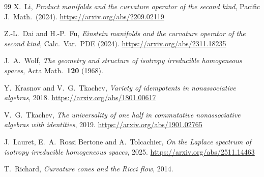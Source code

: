\begin{thebibliography}{99}
 X.~Li,
\emph{Product manifolds and the curvature operator of the second kind},
Pacific J.\ Math.\ (2024).
\url{https://arxiv.org/abs/2209.02119}

 Z.-L.~Dai and H.-P.~Fu,
\emph{Einstein manifolds and the curvature operator of the second kind},
Calc.\ Var.\ PDE (2024).
\url{https://arxiv.org/abs/2311.18235}

 J.~A.~Wolf,
\emph{The geometry and structure of isotropy irreducible homogeneous spaces},
Acta Math.\ \textbf{120} (1968).

 Y.~Krasnov and V.~G.~Tkachev,
\emph{Variety of idempotents in nonassociative algebras}, 2018.
\url{https://arxiv.org/abs/1801.00617}

 V.~G.~Tkachev,
\emph{The universality of one half in commutative nonassociative algebras with identities}, 2019.
\url{https://arxiv.org/abs/1901.02765}

 J.~Lauret, E.~A.~Rossi Bertone and A.~Tolcachier,
\emph{On the Laplace spectrum of isotropy irreducible homogeneous spaces}, 2025.
\url{https://arxiv.org/abs/2511.14463}

 T.~Richard,
\emph{Curvature cones and the Ricci flow}, 2014.

\end{thebibliography}
